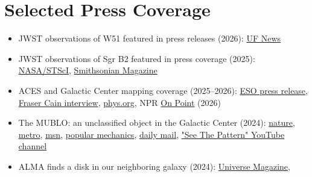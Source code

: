 
\setlength{\extrarowheight}{7pt}

\section*{Selected Press Coverage}

\begin{itemize}
        \item JWST observations of W51 featured in press releases (2026):
                \href{https://news.ufl.edu/2026/03/jwst-images/}{UF News}
        \item JWST observations of Sgr B2 featured in press coverage (2025):
                \href{https://science.nasa.gov/missions/webb/nasas-webb-explores-largest-star-forming-cloud-in-milky-way/}{NASA/STScI},
                \href{https://www.smithsonianmag.com/smart-news/the-james-webb-space-telescope-has-captured-our-galaxys-most-productive-star-forming-region-in-stunning-detail-180987422/}{Smithsonian Magazine}
        \item ACES and Galactic Center mapping coverage (2025--2026):
                \href{https://www.eso.org/public/unitedkingdom/news/eso2603/}{ESO press release},
                \href{https://www.youtube.com/watch?v=HOtrFizknio}{Fraser Cain interview},
                \href{https://phys.org/news/2025-05-clearer-3d-galactic-center.html}{phys.org},
                NPR \href{https://www.wbur.org/onpoint}{On Point} (2026)
    \item The MUBLO: an unclassified object in the Galactic Center (2024):
        \href{https://www.nature.com/articles/d41586-024-01702-4}{nature},
        \href{https://metro.co.uk/2024/06/19/something-lurking-milky-way-no-idea-21063534/}{metro},
        \href{https://www.msn.com/en-gb/news/world/scientists-uncover-mysterious-object-in-heart-of-milky-way-unlike-anything-seen-before/ar-BB1ouFBF}{msn},
        \href{https://www.popularmechanics.com/space/deep-space/a61145577/mysterious-microwave-emitting-object-milky-way-discovery/}{popular mechanics},
        \href{https://www.dailymail.co.uk/sciencetech/article-13543317/Scientists-spot-mysterious-object-galaxy-center-Milky-Way.html}{daily mail},
        \href{https://www.youtube.com/watch?v=lmBREIzeOI0}{"See The Pattern" YouTube channel}
    \item ALMA finds a disk in our neighboring galaxy (2024): 
            \href{https://universemagazine.com/en/alma-discovers-a-protoplanetary-disk-outside-the-milky-way-for-the-first-time/}{Universe Magazine},

\end{itemize}
